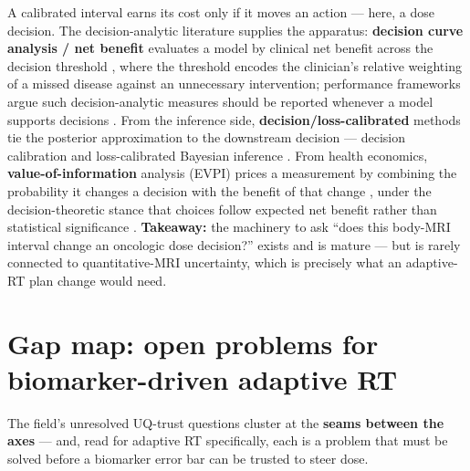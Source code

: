 \documentclass[review,number]{elsarticle}
\begin{document}
A calibrated interval earns its cost only if it moves an action --- here, a dose
decision. The decision-analytic literature supplies the apparatus: \textbf{decision curve
analysis / net benefit} evaluates a model by clinical net benefit across the decision
threshold \cite{vickers2006,vickers2016,vickers2019}, where the threshold encodes the
clinician's relative weighting of a missed disease against an unnecessary intervention;
performance frameworks argue such decision-analytic measures should be reported whenever a
model supports decisions \cite{steyerberg2010}. From the inference side,
\textbf{decision/loss-calibrated} methods tie the posterior approximation to the
downstream decision --- decision calibration \cite{zhao2021} and loss-calibrated
Bayesian inference \cite{vadera2021}. From health economics,
\textbf{value-of-information} analysis (EVPI) prices a measurement by combining the
probability it changes a decision with the benefit of that change \cite{felli1998},
under the decision-theoretic stance that choices follow expected net benefit rather than
statistical significance \cite{claxton1999}. \textbf{Takeaway:} the machinery to ask
``does this body-MRI interval change an oncologic dose decision?'' exists and is mature
--- but is rarely connected to quantitative-MRI uncertainty, which is precisely what an
adaptive-RT plan change would need.

\section{Gap map: open problems for biomarker-driven adaptive RT}
\label{sec:gaps}

The field's unresolved UQ-trust questions cluster at the \textbf{seams between the
axes} --- and, read for adaptive RT specifically, each is a problem that must be solved
before a biomarker error bar can be trusted to steer dose.
\end{document}
